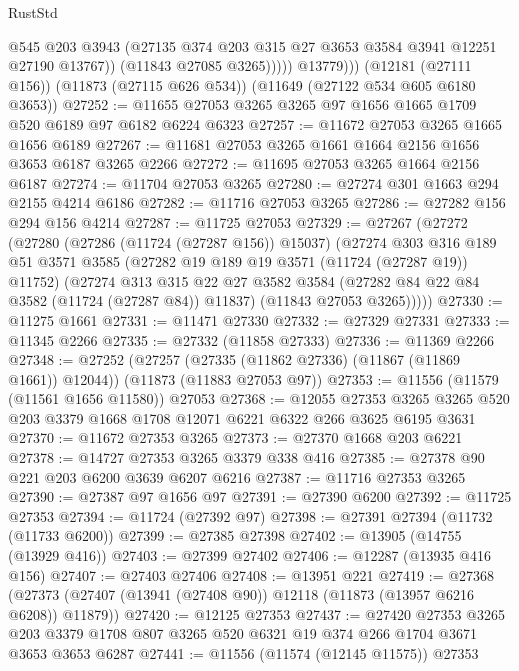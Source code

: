 \begin{lexlean}{RustStd}
\begin{coremodule}
                    @545
                    @203
                    @3943
                    (@27135 @374 @203 @315 @27 @3653 @3584 @3941 @12251 @27190 @13767))
                  (@11843 @27085 @3265)))))
          @13779)))
    (@12181 (@27111 @156))
    (@11873 (@27115 @626 @534))
    (@11649 (@27122 @534 @605 @6180 @3653))
@27252 := @11655 @27053 @3265 @3265 @97 @1656 @1665 @1709 @520 @6189 @97 @6182 @6224 @6323
@27257 := @11672 @27053 @3265 @1665 @1656 @6189
@27267 := @11681 @27053 @3265 @1661 @1664 @2156 @1656 @3653 @6187 @3265 @2266
@27272 := @11695 @27053 @3265 @1664 @2156 @6187
@27274 := @11704 @27053 @3265
@27280 := @27274 @301 @1663 @294 @2155 @4214 @6186
@27282 := @11716 @27053 @3265
@27286 := @27282 @156 @294 @156 @4214
@27287 := @11725 @27053
@27329 := @27267
    (@27272
      (@27280
        (@27286 (@11724 (@27287 @156)) @15037)
        (@27274
          @303
          @316
          @189
          @51
          @3571
          @3585
          (@27282 @19 @189 @19 @3571 (@11724 (@27287 @19)) @11752)
          (@27274
            @313
            @315
            @22
            @27
            @3582
            @3584
            (@27282 @84 @22 @84 @3582 (@11724 (@27287 @84)) @11837)
            (@11843 @27053 @3265)))))
@27330 := @11275 @1661
@27331 := @11471 @27330
@27332 := @27329 @27331
@27333 := @11345 @2266
@27335 := @27332 (@11858 @27333)
@27336 := @11369 @2266
@27348 := @27252
    (@27257 (@27335 (@11862 @27336) (@11867 (@11869 @1661)) @12044))
    (@11873 (@11883 @27053 @97))
@27353 := @11556 (@11579 (@11561 @1656 @11580)) @27053
@27368 := @12055
    @27353
    @3265
    @3265
    @520
    @203
    @3379
    @1668
    @1708
    @12071
    @6221
    @6322
    @266
    @3625
    @6195
    @3631
@27370 := @11672 @27353 @3265
@27373 := @27370 @1668 @203 @6221
@27378 := @14727 @27353 @3265 @3379 @338 @416
@27385 := @27378 @90 @221 @203 @6200 @3639 @6207 @6216
@27387 := @11716 @27353 @3265
@27390 := @27387 @97 @1656 @97
@27391 := @27390 @6200
@27392 := @11725 @27353
@27394 := @11724 (@27392 @97)
@27398 := @27391 @27394 (@11732 (@11733 @6200))
@27399 := @27385 @27398
@27402 := @13905 (@14755 (@13929 @416))
@27403 := @27399 @27402
@27406 := @12287 (@13935 @416 @156)
@27407 := @27403 @27406
@27408 := @13951 @221
@27419 := @27368 (@27373 (@27407 (@13941 (@27408 @90)) @12118 (@11873 (@13957 @6216 @6208)) @11879))
@27420 := @12125 @27353
@27437 := @27420
    @27353
    @3265
    @203
    @3379
    @1708
    @807
    @3265
    @520
    @6321
    @19
    @374
    @266
    @1704
    @3671
    @3653
    @3653
    @6287
@27441 := @11556 (@11574 (@12145 @11575)) @27353

\end{coremodule}
\end{lexlean}
